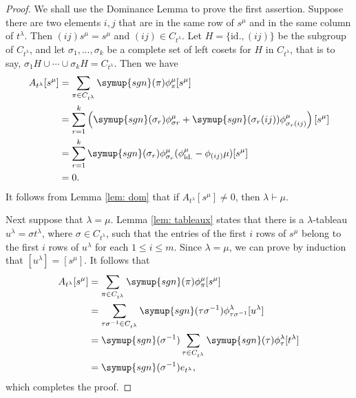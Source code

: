 \documentclass{assignment}[2019/10/15]
\newcommand{\lr}[3]{\left#1#3\right#2}
\theoremstyle{plain}
\newcommand{\sgn}{\mathop{}\!\symup{sgn}}
\newcommand{\id}{\text{id.}}
\numberwithin{equation}{section}
\begin{document}
    \begin{proof}
        We shall use the Dominance Lemma to prove the first assertion. Suppose there are two elements $i, j$ that are in the same row of $s^\mu$ and in the same column of $t^\lambda$. Then $(i j)s^\mu = s^\mu$ and $(i j)\in C_{t^\lambda}$. Let $H=\{\id, (i j)\}$ be the subgroup of $C_{t^\lambda}$, and let $\sigma_1, \dotsc, \sigma_k$ be a complete set of left cosets for $H$ in $C_{t^\lambda}$, that is to say, $\sigma_1H\cup\dotsb \cup \sigma_kH = C_{t^\lambda}$. Then we have
        \begin{equation}
            \begin{aligned}
                A_{t^\lambda}[s^\mu] &= \sum_{\pi\in C_{t^\lambda}}\sgn(\pi)\phi_\pi^\mu[s^\mu]\\
                &= \sum_{r=1}^k \lr(){\sgn(\sigma_r)\phi_{\sigma r}^\mu + \sgn(\sigma_r(i j))\phi_{\sigma_r(i j)}^\mu}[s^\mu]\\
                &= \sum_{r=1}^k\sgn(\sigma_r)\phi_{\sigma_r}^\mu(\phi_\id^\mu-\phi_{(i j)}\mu)[s^\mu]\\
                &= 0.
            \end{aligned}
        \end{equation}
        It follows from Lemma \ref{lem: dom} that if $A_{t^\lambda}[s^\mu]\neq 0$, then $\lambda\vdash\mu$.

        Next suppose that $\lambda=\mu$. Lemma \ref{lem: tableaux} states that there is a $\lambda$-tableau $u^\lambda = \sigma t^\lambda$, where $\sigma\in C_{t^\lambda}$, such that the entries of the first $i$ rows of $s^\mu$ belong to the first $i$ rows of $u^\lambda$ for each $1\leq i\leq m$. Since $\lambda=\mu$, we can prove by induction that $[u^\lambda]=[s^\mu]$. It follows that
        \begin{equation}
            \begin{aligned}
                A_{t^\lambda}[s^\mu]
                &= \sum_{\pi\in C_{t^\lambda}}\sgn(\pi)\phi_\pi^\mu[s^\mu]\\
                &= \sum_{\tau\sigma^{-1}\in C_{t^\lambda}}\sgn(\tau\sigma^{-1})\phi_{\tau\sigma^{-1}}^\lambda[u^\lambda]\\
                &= \sgn(\sigma^{-1})\sum_{\tau\in C_{t^\lambda}}\sgn(\tau)\phi_\tau^\lambda[t^\lambda]\\
                &= \sgn(\sigma^{-1})e_{t^\lambda},
            \end{aligned}
        \end{equation}
        which completes the proof.
    \end{proof}
\end{document}
